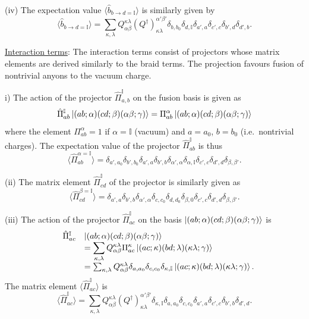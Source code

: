 \documentclass[aps,reprint,superscriptaddress,amsmath,amssymb,amsfonts,prb]{revtex4-1}
\newcommand{\mbb}[1]{\mathbb{#1}}
\begin{document}
(iv) The expectation value $\langle \hat{b}_{b \rightarrow d=\mbb{I}} \rangle$ is similarly given by
\begin{equation}
\langle \hat{b}_{b \rightarrow d=\mbb{I}} \rangle = \sum_{\kappa, \lambda} Q_{\alpha \beta}^{\kappa \lambda} (Q^{\dagger})^{\alpha' \beta'}_{\kappa \lambda} \delta_{b,b_0} \delta_{d,\mbb{I}} \delta_{a',a} \delta_{c',c} \delta_{b',d} \delta_{d',b} .
\end{equation}

\underline{Interaction terms}:
The interaction terms consist of projectors whose matrix elements are derived similarly to the braid terms. The projection favours fusion of nontrivial anyons to the vacuum charge.

i) The action of the projector $\hat{\Pi}_{a,b}^{\mbb{I}}$ on the fusion basis is given as
\begin{equation}
\hat{\Pi}_{ab}^{\mbb{I}} \ket{(ab; \alpha)(cd;\beta)(\alpha \beta;\gamma)}
= \Pi_{ab}^{\alpha} \ket{(ab; \alpha)(cd;\beta)(\alpha \beta;\gamma)}
\end{equation}
where the element $\Pi_{ab}^{\alpha} = 1$ if $\alpha = \mbb{I}$ (vacuum) and $a=a_0$, $b=b_0$ (i.e.~nontrivial charges). The expectation value of the projector $\hat{\Pi}_{ab}^{\mbb{I}}$ is thus
\begin{equation}
 \langle \hat{\Pi}_{ab}^{\alpha=\mbb{I}} \rangle = \delta_{a',a_0} \delta_{b',b_0} \delta_{a',a} \delta_{b',b} \delta_{\alpha',\alpha} \delta_{\alpha,\mbb{I}} \delta_{c',c} \delta_{d',d} \delta_{\beta,\beta'} .
\end{equation}

(ii) The matrix element $\hat{\Pi}_{cd}^{\mbb{I}}$ of the projector is similarly given as
\begin{equation}
 \langle \hat{\Pi}_{cd}^{\beta=\mbb{I}} \rangle = \delta_{a',a} \delta_{b',b} \delta_{\alpha',\alpha} \delta_{c,c_0} \delta_{d,d_0} \delta_{\beta,0} \delta_{c',c} \delta_{d',d} \delta_{\beta,\beta'} .
\end{equation}

(iii) The action of the projector $\hat{\Pi}_{ac}^{\mbb{I}}$ on the basis $\ket{(ab;\alpha)(cd;\beta)(\alpha \beta; \gamma)}$ is 
\[
\begin{array}{lll}
&\hat{\Pi}_{ac}^{\mbb{I}}& \ket{(ab;\alpha)(cd;\beta)(\alpha \beta; \gamma)} \\
&&= \displaystyle{\sum_{\kappa, \lambda} Q_{\alpha \beta}^{\kappa \lambda} \Pi_{ac}^{\kappa} \ket{(ac;\kappa)(bd;\lambda)(\kappa \lambda; \gamma)} } \\
&&= \sum_{\kappa, \lambda} Q_{\alpha \beta}^{\kappa \lambda} \delta_{a,a_0} \delta_{c,c_0} \delta_{\kappa,\mbb{I}} \ket{(ac;\kappa)(bd;\lambda)(\kappa \lambda; \gamma)} .
\end{array}
\]
The matrix element $\langle \hat{\Pi}_{ac}^{\mbb{I}} \rangle$ is 
\begin{equation}
\langle \hat{\Pi}_{ac}^{\mbb{I}} \rangle = \sum_{\kappa, \lambda} Q_{\alpha \beta}^{\kappa \lambda} (Q^{\dagger})^{\alpha' \beta'}_{\kappa \lambda} \delta_{\kappa, \mbb{I}} \delta_{a,a_0} \delta_{c,c_0} \delta_{a',a} \delta_{c',c} \delta_{b',b} \delta_{d',d} .
\end{equation}
\end{document}
